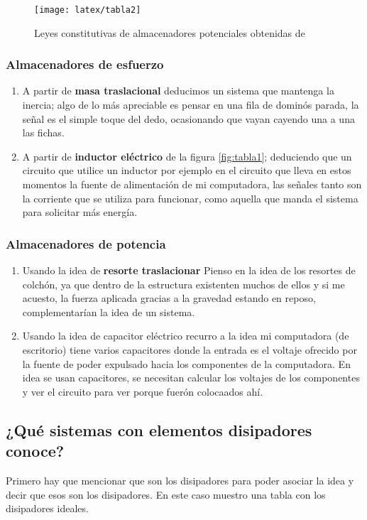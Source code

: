\begin{figure}[H]
	\centering
	\caption{Leyes constitutivas de almacenadores potenciales obtenidas de \cite{w1}}
	\texttt{[image: latex/tabla2]}
	\label{fig:tabla2}
\end{figure}

\subsubsection{Almacenadores de esfuerzo}

\begin{enumerate}
	\item A partir de \textbf{masa traslacional} deducimos un sistema que mantenga la inercia; algo de lo más apreciable es pensar en una fila de dominós parada, la señal es el simple toque del dedo, ocasionando que vayan cayendo una a una las fichas.
	\item A partir de \textbf{inductor eléctrico} de la figura \ref{fig:tabla1}; deduciendo que un circuito que utilice un inductor por ejemplo en el circuito que lleva en estos momentos la fuente de alimentación de mi computadora, las señales tanto son la corriente que se utiliza para funcionar, como aquella que manda el sistema para solicitar más energía.
\end{enumerate}

\subsubsection{Almacenadores de potencia}

\begin{enumerate}
	\item Usando la idea de \textbf{resorte traslacionar} Pienso en la idea de los resortes de colchón, ya que dentro de la estructura existenten muchos de ellos y si me acuesto, la fuerza aplicada gracias a la gravedad estando en reposo, complementarían la idea de un sistema.
	\item Usando la idea de capacitor eléctrico recurro a la idea mi computadora (de escritorio) tiene varios capacitores donde la entrada es el voltaje ofrecido por la fuente de poder expulsado  hacia los componentes de la computadora. En idea se usan capacitores, se necesitan calcular los voltajes de los componentes y ver el circuito para ver porque fuerón colocaados ahí.
\end{enumerate}

\subsection{¿Qué sistemas con elementos disipadores conoce?}
Primero hay que mencionar que son los disipadores para poder asociar la idea y decir que esos son los disipadores. En este caso muestro una tabla con los disipadores ideales.

